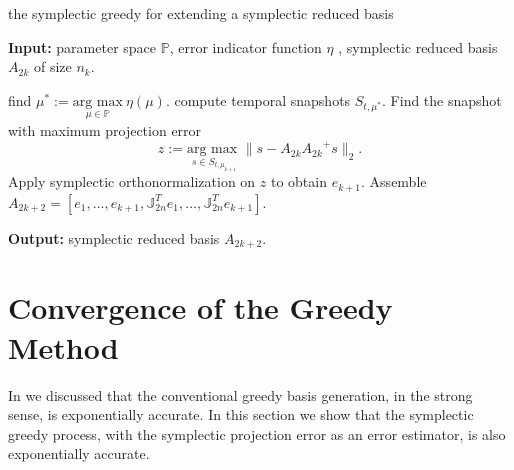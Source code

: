 \begin{algorithm} 
	\caption{the symplectic greedy for extending a symplectic reduced basis} \label{alg:4.1}
	\textbf{Input:} parameter space $\mathbb P$, error indicator function $\eta$ , symplectic reduced basis $A_{2k}$ of size $n_k$.
	\begin{algorithmic} [1]
		\State find $\mu^* := \underset{\mu \in \mathbb P}{\text{arg\ max}} \ \eta(\mu)$.
		\State compute temporal snapshots $S_{t,\mu^*}$.
		\State Find the snapshot with maximum projection error
		\[
			z := \underset{s\in S_{t,\mu_{k+1}}}{\text{arg\ max }} \| s - A_{2k}{A_{2k}}^+s \|_2.
		\]
		\State Apply symplectic orthonormalization on $z$ to obtain $e_{k+1}$.
		\State Assemble $A_{2k+2} = [e_1,\dots,e_{k+1},\mathbb J_{2n}^T e_1,\dots,\mathbb J_{2n}^T e_{k+1} ]$.
	\end{algorithmic}
	\vspace{0.5cm}
	\textbf{Output:} symplectic reduced basis $A_{2k+2}$.
\end{algorithm}


\section{Convergence of the Greedy Method} \label{p1.chap:SyMo.PrSy:4}

In  we discussed that the conventional greedy basis generation, in the strong sense, is exponentially accurate. In this section we show that the symplectic greedy process, with the symplectic projection error as an error estimator, is also exponentially accurate.

